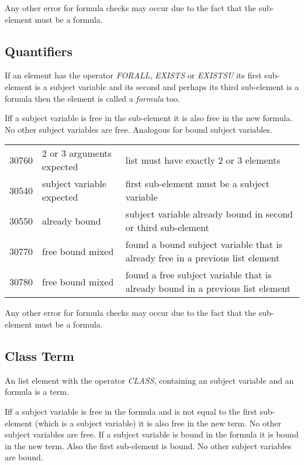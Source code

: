 \documentclass[a4paper,german,10pt,twoside]{book}
\theoremstyle{definition}
\theoremstyle{remark}
\begin{document}
\par
Any other error for formula checks may occur due to the fact that the sub-element must be a formula.


\subsection{Quantifiers
}
If an element has the operator \emph{FORALL}, \emph{EXISTS} or \emph{EXISTSU} its first sub-element is a subject variable and its second and perhaps its third sub-element is a formula then the element is called a \emph{formula} too.

\par
Iff a subject variable is free in the sub-element it is also free in the new formula. No other subject variables are free. Analogous for bound subject variables. 

\begin{tabularx}{\linewidth}{llX}
  30760  & $2$ or $3$ arguments expected & list must have exactly $2$ or $3$ elements \\
  30540  & subject variable expected & first sub-element must be a subject variable \\
  30550  & already bound             & subject variable already bound in second or third sub-element \\
  30770  & free bound mixed          & found a bound subject variable that is already free in a previous list element \\
  30780  & free bound mixed          & found a free subject variable that is already bound in a previous list element 
\end{tabularx}

\par
Any other error for formula checks may occur due to the fact that the sub-element must be a formula.


\subsection{Class Term
}
An list element with the operator \emph{CLASS}, containing an subject variable and an formula is a term.

\par
Iff a subject variable is free in the formula and is not equal to the first sub-element (which is a subject variable) it is also free in the new term. No other subject variables are free. If a subject variable is bound in the formula it is bound in the new term. Also the first sub-element is bound. No other subject variables are bound.
\end{document}

